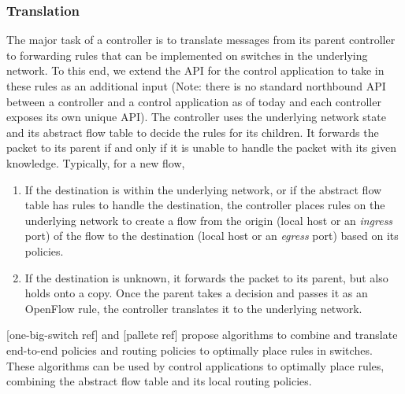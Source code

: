 \documentclass[10pt, twocolumn]{article}
\begin{document}
\subsubsection{Translation}
The major task of a controller is to translate messages from its parent controller to forwarding rules that can be implemented on switches in the underlying network. To this end, we extend the API for the control application to take in these rules as an additional input (Note: there is no standard northbound API between a controller and a control application as of today and each controller exposes its own unique API). The controller uses the underlying network state and its abstract flow table to decide the rules for its children. It forwards the packet to its parent if and only if it is unable to handle the packet with its given knowledge. Typically, for a new flow,
\begin{enumerate}
    \item If the destination is within the underlying network, or if the abstract flow table has rules to handle the destination, the controller places rules on the underlying network to create a flow from the origin (local host or an \emph{ingress} port) of the flow to the destination (local host or an \emph{egress} port) based on its policies.
    \item If the destination is unknown, it forwards the packet to its parent, but also holds onto a copy. Once the parent takes a decision and passes it as an OpenFlow rule, the controller translates it to the underlying network.
\end{enumerate}

[one-big-switch ref] and [pallete ref] propose algorithms to combine and translate end-to-end policies and routing policies to optimally place rules in switches. These algorithms can be used by control applications to optimally place rules, combining the abstract flow table and its local routing policies.
\end{document}
